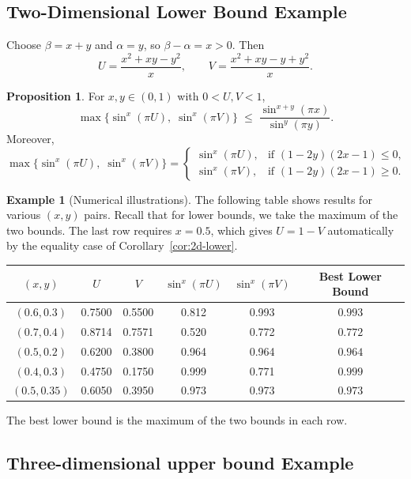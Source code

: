 \documentclass[12pt]{amsart}
\theoremstyle{definition}
\newtheorem{proposition}{Proposition}[section]
\newtheorem{example}{Example}[section]
\begin{document}
\subsection{Two-Dimensional Lower Bound Example}

Choose $\beta = x + y$ and $\alpha = y$, so $\beta-\alpha = x > 0$. Then
\[
U = \frac{x^2 + xy - y^2}{x}, \qquad
V = \frac{x^2 + xy - y + y^2}{x}.
\]

\begin{proposition}\label{prop:2d-lower-concrete}
For $x,y\in(0,1)$ with $0<U,V<1$,
\[
\max\{\sin^{x}(\pi U),\;\sin^{x}(\pi V)\} \;\leq\; \frac{\sin^{x+y}(\pi x)}{\sin^{y}(\pi y)}.
\]
Moreover,
\[
\max\{\sin^{x}(\pi U),\;\sin^{x}(\pi V)\}
=
\begin{cases}
\sin^{x}(\pi U), & \text{if } (1-2y)(2x-1) \le 0,\\
\sin^{x}(\pi V), & \text{if } (1-2y)(2x-1) \ge 0.
\end{cases}
\]
\end{proposition}

\begin{example}[Numerical illustrations]
The following table shows results for various $(x,y)$ pairs. Recall that for lower bounds, we take the maximum of the two bounds. The last row requires $x=0.5$, which gives $U=1-V$ automatically by the equality case of Corollary~\ref{cor:2d-lower}.

\begin{table}[h]
\centering
\begin{tabular}{|c|c|c|c|c|c|}
\hline
$(x,y)$ & $U$ & $V$ & $\sin^{x}(\pi U)$ & $\sin^{x}(\pi V)$ & Best Lower Bound \\
\hline
$(0.6,0.3)$ & 0.7500 & 0.5500 & 0.812 & 0.993 & $ 0.993$ \\
$(0.7,0.4)$ & 0.8714 & 0.7571 & 0.520 & 0.772 & $ 0.772$ \\
$(0.5,0.2)$ & 0.6200 & 0.3800 & 0.964 & 0.964 & $ 0.964$ \\
$(0.4,0.3)$ & 0.4750 & 0.1750 & 0.999 & 0.771 & $ 0.999$ \\
$(0.5,0.35)$ & 0.6050 & 0.3950 & 0.973 & 0.973 & $ 0.973$ \\
\hline
\end{tabular}
\end{table}
\noindent The best lower bound is the maximum of the two bounds in each row.
\end{example}

\subsection{Three-dimensional upper bound Example}
\end{document}
